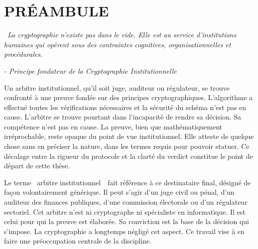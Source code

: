 
\chapter*{PR\'EAMBULE}
\thispagestyle{preliminaire}

\begin{flushright}
  \begin{minipage}{0.72\textwidth}
    \itshape
    \guillemotleft~La cryptographie n'existe pas dans le vide. Elle est au service
    d'institutions humaines qui op\`erent sous des contraintes cognitives,
    organisationnelles et proc\'edurales.~\guillemotright
  \end{minipage}
\end{flushright}
\vspace{0.3cm}
\begin{flushright}
  \small\textit{- Principe fondateur de la Cryptographie
  Institutionnelle~\cite{MINKA2026CLO}}
\end{flushright}

\vspace{1.0cm}

Un arbitre institutionnel, qu'il soit juge, auditeur ou r\'egulateur, se trouve
confront\'e \`a une preuve fond\'ee sur des principes cryptographiques.
L'algorithme a effectu\'e toutes les v\'erifications n\'ecessaires et la
s\'ecurit\'e du sch\'ema n'est pas en cause. L'arbitre se trouve pourtant
dans l'incapacit\'e de rendre sa d\'ecision. Sa comp\'etence n'est pas en
cause. La preuve, bien que math\'ematiquement irr\'eprochable, reste opaque
du point de vue institutionnel. Elle atteste de quelque chose sans en pr\'eciser la nature,
dans les termes requis pour pouvoir statuer. Ce d\'ecalage entre la
rigueur du protocole et la clart\'e du verdict constitue le point de
d\'epart de cette th\`ese.

Le terme \guillemotleft~arbitre institutionnel~\guillemotright~fait r\'ef\'erence
\`a ce destinataire final, d\'esign\'e de fa\c{c}on volontairement g\'en\'erique. Il peut s'agir d'un
juge civil ou p\'enal, d'un auditeur des finances publiques, d'une commission
\'electorale ou d'un r\'egulateur sectoriel. Cet arbitre n'est ni cryptographe
ni sp\'ecialiste en informatique. Il est celui pour qui la preuve est
\'elabor\'ee. Sa conviction est la base de la d\'ecision qui s'impose. La
cryptographie a longtemps n\'eglig\'e cet aspect. Ce travail vise \`a en faire
une pr\'eoccupation centrale de la discipline.

